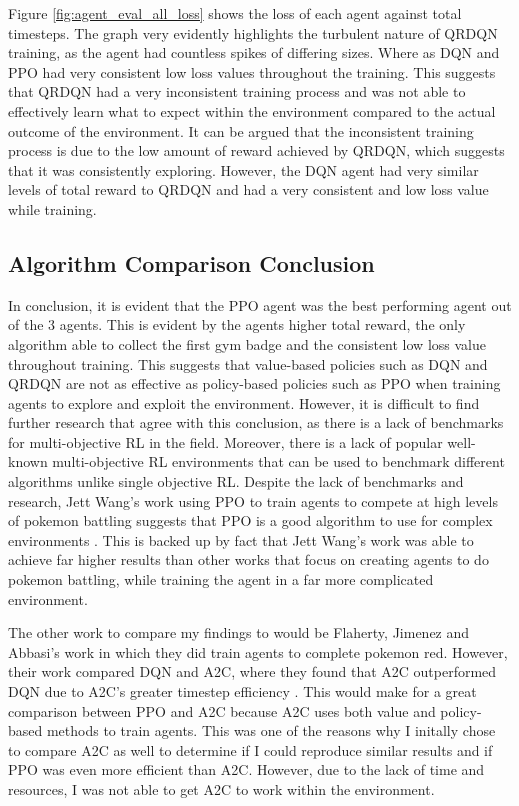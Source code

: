 Figure \ref{fig:agent_eval_all_loss} shows the loss of each agent against total timesteps. The graph very evidently highlights the turbulent nature of QRDQN training, as the agent had countless spikes of differing sizes. Where as DQN and PPO had very consistent low loss values throughout the training. This suggests that QRDQN had a very inconsistent training process and was not able to effectively learn what to expect within the environment compared to the actual outcome of the environment. It can be argued that the inconsistent training process is due to the low amount of reward achieved by QRDQN, which suggests that it was consistently exploring. However, the DQN agent had very similar levels of total reward to QRDQN and had a very consistent and low loss value while training. 

\subsection{Algorithm Comparison Conclusion}

In conclusion, it is evident that the PPO agent was the best performing agent out of the 3 agents. This is evident by the agents higher total reward, the only algorithm able to collect the first gym badge and the consistent low loss value throughout training. This suggests that value-based policies such as DQN and QRDQN are not as effective as policy-based policies such as PPO when training agents to explore and exploit the environment. However, it is difficult to find further research that agree with this conclusion, as there is a lack of benchmarks for multi-objective RL in the field. Moreover, there is a lack of popular well-known multi-objective RL environments that can be used to benchmark different algorithms unlike single objective RL. Despite the lack of benchmarks and research, Jett Wang's work using PPO to train agents to compete at high levels of pokemon battling suggests that PPO is a good algorithm to use for complex environments \cite{wang2020winning}. This is backed up by fact that Jett Wang's work was able to achieve far higher results than other works that focus on creating agents to do pokemon battling, while training the agent in a far more complicated environment. 

The other work to compare my findings to would be Flaherty, Jimenez and Abbasi's work in which they did train agents to complete pokemon red. However, their work compared DQN and A2C, where they found that A2C outperformed DQN due to A2C's greater timestep efficiency \cite{flaherty2021playing}. This would make for a great comparison between PPO and A2C because A2C uses both value and policy-based methods to train agents. This was one of the reasons why I initally chose to compare A2C as well to determine if I could reproduce similar results and if PPO was even more efficient than A2C. However, due to the lack of time and resources, I was not able to get A2C to work within the environment. 

